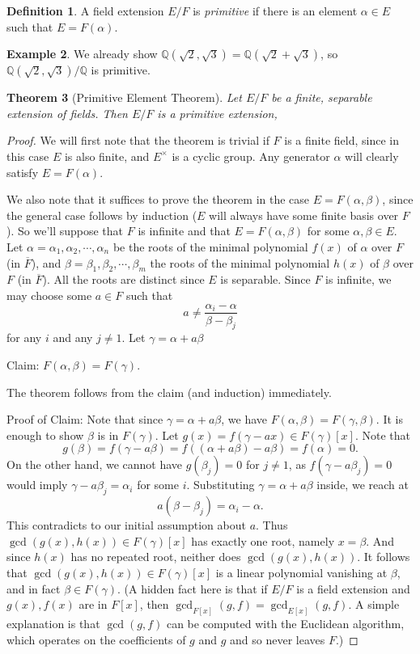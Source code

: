 \documentclass[12pt]{report}
\newtheorem{thm}{Theorem}[section]
\theoremstyle{definition}
\newtheorem{defn}[thm]{Definition}
\newtheorem{example}[thm]{Example}
\def\QQ{\mathbb{Q}}
\def\aa{\alpha}
\def\bb{\beta}
\begin{document}
\begin{defn}
    A field extension $E/F$ is \emph{primitive} if there is an element $\aa\in E$ such that $E=F(\aa)$.
\end{defn}

\begin{example}
    We already show $\QQ(\sqrt{2},\sqrt{3})=\QQ(\sqrt{2}+\sqrt{3})$, so $\QQ(\sqrt{2},\sqrt{3})/\QQ$ is primitive.
\end{example}

\begin{thm}[Primitive Element Theorem]\label{primitive}
    Let $E/F$ be a finite, separable extension of fields. Then $E/F$ is a primitive extension,
\end{thm}

\begin{proof}
    We will first note that the theorem is trivial if $F$ is a finite field, since in this case $E$ is also finite, and $E^\times$ is a cyclic group. Any generator $\aa$ will clearly satisfy $E = F(\aa)$.

    We also note that it suffices to prove the theorem in the case $E = F(\aa,\bb)$, since the general case follows by induction ($E$ will always have some finite basis over $F$). So we'll suppose that $F$ is infinite and that $E=F(\aa,\bb)$ for some $\aa,\bb\in E$.
    Let $\aa=\aa_1,\aa_2,\cdots,\aa_n$ be the roots of the minimal polynomial $f(x)$ of $\aa$ over $F$ (in $\overline{F}$), and $\bb=\bb_1,\bb_2,\cdots,\bb_m$ the roots of the minimal polynomial $h(x)$ of $\bb$ over $F$ (in $\overline{F}$). All the roots are distinct since $E$ is separable. Since $F$ is infinite, we may choose some $a \in F$ such that $$a\not= \frac{\aa_i-\aa}{\bb-\bb_j}$$ for any $i$ and any $j \not= 1$. Let $\gamma = \aa+a\bb$

    Claim: $F(\aa,\bb)=F(\gamma)$.

    The theorem follows from the claim (and induction) immediately.

    Proof of Claim: Note that since $\gamma = \aa+a\bb$, we have $F(\aa,\bb)=F(\gamma,\beta)$. It is enough to show $\beta$ is in $F(\gamma)$. Let $g(x) = f(\gamma - ax) \in F(\gamma)[x]$. Note that 
    $$g(\beta) =f(\gamma - a \beta) = f((\aa+a\bb)-a\bb) = f(\aa) = 0.$$
    On the other hand, we cannot have $g(\beta_j)=0$ for $j \not=1$, as $f(\gamma - a\beta_j)=0$ would imply $\gamma-a\beta_j=\aa_i$ for some $i$. Substituting $\gamma= \aa+a\bb$ inside, we reach at
     $$a(\bb-\bb_j)=\aa_i-\aa.$$
    This contradicts to our initial assumption about $a$. Thus $\gcd(g(x), h(x))\in F(\gamma)[x]$ has exactly one root, namely $x =\beta$. And since $h(x)$ has no repeated root, neither does $\gcd(g(x), h(x))$. It follows that $\gcd(g(x), h(x)) \in F(\gamma)[x]$ is a linear polynomial vanishing at $\beta$, and in fact $\beta \in F(\gamma)$. (A hidden fact here is that if $E/F$ is a field extension and $g(x),f(x)$ are in $F[x]$, then $\gcd_{F[x]}(g,f) = \gcd_{E[x]}(g,f)$. A simple explanation is that $\gcd(g,f)$ can be computed with the Euclidean algorithm, which operates on the coefficients of $g$ and $g$ and so never leaves $F$.)
\end{proof}
\end{document}
